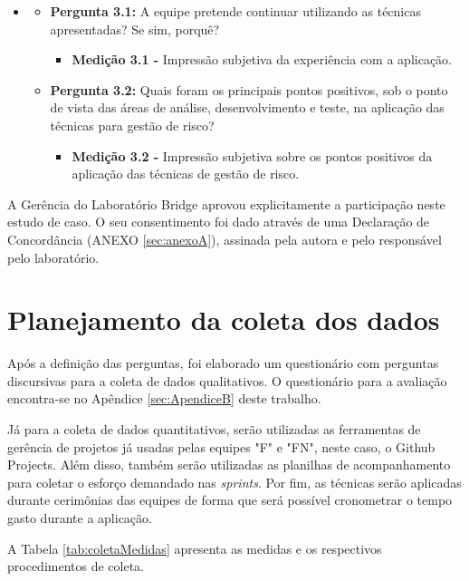 \documentclass[
    12pt,       %
    openright,      %
    twoside,      %
    a4paper,      %
    english,      %
    french,       %
    spanish,      %
    brazil,       %
    ]{abntex2}
\begin{document}
\begin{itemize}[label={}]
\item
\begin{itemize}
        \item \textbf{Pergunta 3.1:} A equipe pretende continuar utilizando as técnicas apresentadas? Se sim, porquê?
            \begin{itemize}[label={}]
                \item \textbf{Medição 3.1 - } Impressão subjetiva da experiência com a aplicação.
            \end{itemize}
        \item \textbf{Pergunta 3.2:} Quais foram os principais pontos positivos, sob o ponto de vista das áreas de análise, desenvolvimento e teste, na aplicação das técnicas para gestão de risco?
            \begin{itemize}[label={}]
                \item \textbf{Medição 3.2 - } Impressão subjetiva sobre os pontos positivos da aplicação das técnicas de gestão de risco.
            \end{itemize}    
\end{itemize}
\end{itemize} 


A Gerência do Laboratório Bridge aprovou explicitamente a participação neste estudo de caso. O seu consentimento foi dado através de uma Declaração de Concordância (ANEXO \ref{sec:anexoA}), assinada pela autora e pelo responsável pelo laboratório.

\section{Planejamento da coleta dos dados}

Após a definição das perguntas, foi elaborado um questionário com perguntas discursivas para a coleta de dados qualitativos. O questionário para a avaliação encontra-se no Apêndice \ref{sec:ApendiceB} deste trabalho.

Já para a coleta de dados quantitativos, serão utilizadas as ferramentas de gerência de projetos já usadas pelas equipes "F" e "FN", neste caso, o Github Projects. Além disso, também serão utilizadas as planilhas de acompanhamento para coletar o esforço demandado nas \textit{sprints}. Por fim, as técnicas serão aplicadas durante cerimônias das equipes de forma que será possível cronometrar o tempo gasto durante a aplicação. 

A Tabela \ref{tab:coletaMedidas} apresenta as medidas e os respectivos procedimentos de coleta.
\end{document}
